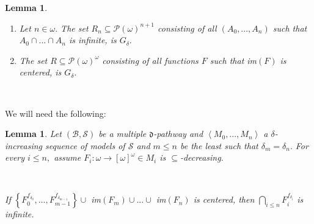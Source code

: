 \documentclass{article}%
\newtheorem{lemma}[theorem]{Lemma}
\begin{document}
\begin{lemma}
\label{Complejidad P punto}\qquad\ \ \ \ \qquad\qquad\ \ \ 

\begin{enumerate}
\item Let $n\in\omega.$ The set $R_{n}\subseteq\mathcal{P}\left(
\omega\right)  ^{n+1}$ consisting of all $\left(  A_{0},...,A_{n}\right)  $
such that $A_{0}\cap...\cap A_{n}$ is infinite, is $G_{\delta}.$

\item The set $R\subseteq\mathcal{P}\left(  \omega\right)  ^{\omega}$
consisting of all functions $F$ such that \textsf{im}$\left(  F\right)  $ is
centered, is $G_{\delta}.$
\end{enumerate}
\end{lemma}

\qquad\qquad\ \ 

We will need the following:

\begin{lemma}
Let $\left(  \mathcal{B},\mathcal{S}\right)  $ be a multiple $\mathfrak{d}%
$-pathway and $\left\langle M_{0},...,M_{n}\right\rangle $ a $\delta
$-increasing sequence of models of $\mathcal{S}$ and $m\leq n$ be the least
such that $\delta_{m}=\delta_{n}.$ For every $i\leq n,$ assume $F_{i}%
:\omega\longrightarrow\left[  \omega\right]  ^{\omega}\in M_{i}$ is
$\subseteq$-decreasing$.$

\qquad\ \ \ \qquad\ \ \ \ \ \ \ \ \qquad\ \ 

If $\left\{  F_{0}^{f_{\delta_{0}}},...,F_{m-1}^{f_{\delta_{m-1}}}\right\}
\cup$ \textsf{im}$\left(  F_{m}\right)  \cup...\cup$ \textsf{im}$\left(
F_{n}\right)  $ is centered, then $%
{\textstyle\bigcap\limits_{i\leq n}}
F_{i}^{f_{\delta_{i}}}$ is infinite. \label{Lema pathways para Ppunto}
\end{lemma}
\end{document}
